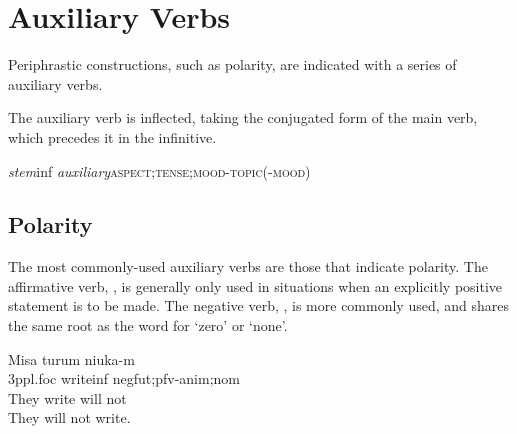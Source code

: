 \documentclass[grammar]{subfiles}
\begin{document}
  \section{Auxiliary Verbs}
  \label{sec:vm_auxiliary}

  Periphrastic constructions, such as polarity, are indicated with a series of auxiliary verbs. 

  The auxiliary verb is inflected, taking the conjugated form of the main verb, which precedes it in the infinitive.

  \begin{exe}
    \ex\label{exe:vm_auxiliary_conjugation} \textit{stem}\bs\acs{inf} \textit{auxiliary}\bs\textsc{aspect;tense;mood-topic(-mood)}
  \end{exe}

  \subsection{Polarity}
  \label{ssec:vm_polarity}

  The most commonly-used auxiliary verbs are those that indicate polarity.  The affirmative verb, , is generally only used in situations when an explicitly positive statement is to be made.  The negative verb, , is more commonly used, and shares the same root as the word for ‘zero’ or ‘none’.

  \begin{exe}
    \ex {}
    \glll Misa turum niuka-m\\
    \acs{3p}\acs{pl}.\acs{foc} write\bs\acs{inf} \acs{neg}\bs\acs{fut};\acs{pfv}-\acs{anim};\acs{nom}\\
    {They} {write} {will not}\\
    \glt They will not write.
  \end{exe}


\end{document}
